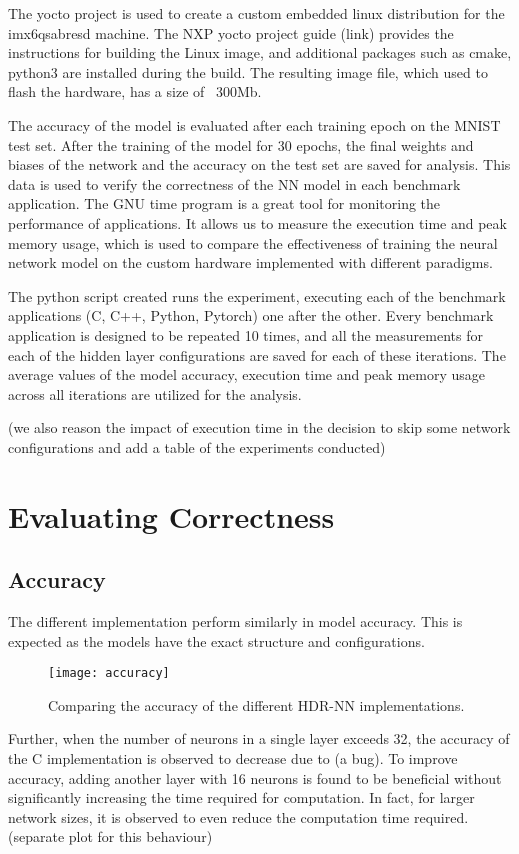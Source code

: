 The yocto project is used to create a custom embedded linux distribution for the imx6qsabresd machine. The NXP yocto project guide (link) provides the instructions for building the Linux image, and additional packages such as cmake, python3 are installed during the build. The resulting image file, which used to flash the hardware, has a size of ~300Mb.

The accuracy of the model is evaluated after each training epoch on the MNIST test set. After the training of the model for 30 epochs, the final weights and biases of the network and the accuracy on the test set are saved for analysis. This data is used to verify the correctness of the NN model in each benchmark application.
The GNU time program is a great tool for monitoring the performance of applications. It allows us to measure the execution time and peak memory usage, which is used to compare the effectiveness of training the neural network model on the custom hardware implemented with different paradigms.

The python script created runs the experiment, executing each of the benchmark applications (C, C++, Python, Pytorch) one after the other. Every benchmark application is designed to be repeated 10 times, and all the measurements for each of the hidden layer configurations are saved for each of these iterations. The average values of the model accuracy, execution time and peak memory usage across all iterations are utilized for the analysis.

(we also reason the impact of execution time in the decision to skip some network configurations and add a table of the experiments conducted)


\section{Evaluating Correctness}
\subsection{Accuracy}
The different implementation perform similarly in model accuracy. This is expected as the models have the exact structure and configurations.
\begin{figure}[ht]
	\centering
	\texttt{[image: accuracy]}
	\caption[HDR-NN Accuracy]{Comparing the accuracy of the different HDR-NN implementations.}
\end{figure}
Further, when the number of neurons in a single layer exceeds 32, the accuracy of the C implementation is observed to decrease due to (a bug). To improve accuracy, adding another layer with 16 neurons is found to be beneficial without significantly increasing the time required for computation. In fact, for larger network sizes, it is observed to even reduce the computation time required. (separate plot for this behaviour)

